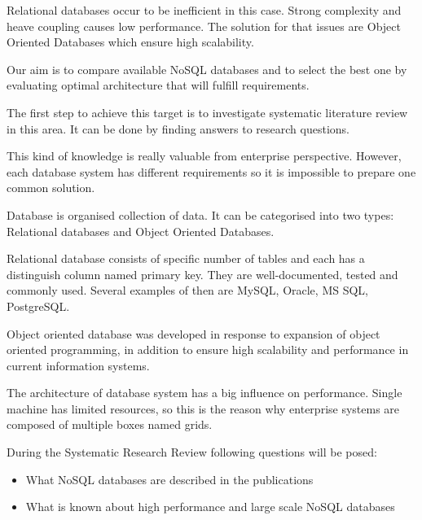 \documentclass[times, 10pt,twocolumn]{article}
\begin{document}
Relational databases occur to be inefficient in this case. Strong complexity and
heave coupling causes low performance. The solution for that issues are Object Oriented
Databases which ensure high scalability.

Our aim is to compare available NoSQL databases and to select the best one by evaluating 
optimal architecture that will fulfill requirements. 

The first step to achieve this target is to investigate systematic literature review in this area.
It can be done by finding answers to research questions.

This kind of knowledge is really valuable from enterprise perspective. However, each database
system has different requirements so it is impossible to prepare one common solution. 
 

Database is organised collection of data. It can be categorised into two types: 
Relational databases and Object Oriented Databases.

Relational database consists of specific number of tables and each has a distinguish column named primary key. 
They are well-documented, tested and commonly used. Several examples of then are MySQL, Oracle, MS SQL, PostgreSQL. 

Object oriented database was developed in response to expansion of object oriented programming, in addition to ensure high scalability and  
performance in current information systems.

The architecture of database system has a big influence on performance. Single machine has limited
resources, so this is the reason why enterprise systems are composed of multiple boxes named grids.


During the Systematic Research Review following questions will be posed: 

\begin{itemize}
  \item What NoSQL databases are described in the publications
  \item What is known about high performance and large scale NoSQL databases   
\end{itemize}
\end{document}
